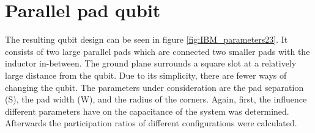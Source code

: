 
\clearpage
\section{Parallel pad qubit}
The resulting qubit design can be seen in figure \ref{fig:IBM_parameters23}. It consists of two large parallel pads which are connected two smaller pads with the inductor in-between. The ground plane surrounds a square slot at a relatively large distance from the qubit. Due to its simplicity, there are fewer ways of changing the qubit. The parameters under consideration are the pad separation (S), the pad width (W), and the radius of the corners. Again, first, the influence different parameters have on the capacitance of the system was determined. Afterwards the participation ratios of different configurations were calculated.

